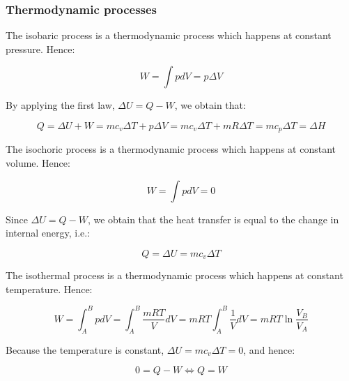 \documentclass{article}
\begin{document}
\subsubsection{Thermodynamic processes}

\begin{proposition}
    The isobaric process is a thermodynamic process which happens at constant pressure. Hence:

    \[ W = \int pdV = p\Delta V \]

    By applying the first law, $\Delta U = Q - W$, we obtain that:

    \[ Q = \Delta U + W = mc_v\Delta T + p\Delta V = mc_v\Delta T + mR\Delta T = mc_p\Delta T = \Delta H \]
\end{proposition}

\begin{proposition}
    The isochoric process is a thermodynamic process which happens at constant volume. Hence:

    \[ W = \int pdV = 0 \]

    Since $\Delta U = Q - W$, we obtain that the heat transfer is equal to the change in internal energy, i.e.:

    \[ Q = \Delta U = mc_v\Delta T \]
\end{proposition}

\begin{proposition}
    The isothermal process is a thermodynamic process which happens at constant temperature. Hence:

    \[ W = \int_A^B pdV = \int_A^B \frac{mRT}{V}dV = mRT \int_A^B \frac{1}{V}dV = mRT \ln{\frac{V_B}{V_A}} \]

    Because the temperature is constant, $\Delta U = mc_v\Delta T = 0$, and hence:

    \[ 0 = Q - W \iff Q = W \]
\end{proposition}
\end{document}

